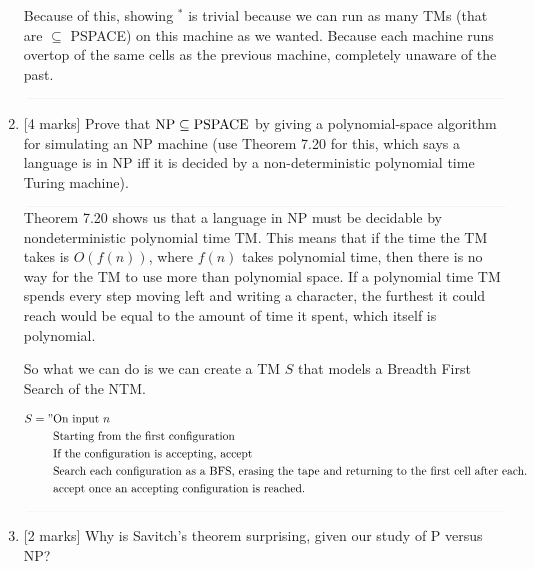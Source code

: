 \documentclass{article}
\begin{document}
\begin{enumerate}
            Because of this, showing $^*$ is trivial because we can run as many TMs (that are $\subseteq$ PSPACE) on this machine as we wanted. Because each machine runs overtop of the same cells as the previous machine, completely unaware of the past.

            $\textcolor[RGB]{220,220,220}{\rule{\linewidth}{0.2pt}}$

    \item {[4 marks]} Prove that ${\rm NP}\subseteq {\rm PSPACE}$ by giving a polynomial-space algorithm for simulating an NP machine (use Theorem 7.20 for this, which says a language is in NP iff it is decided by a non-deterministic polynomial time Turing machine).

            $\textcolor[RGB]{220,220,220}{\rule{\linewidth}{0.2pt}}$
            Theorem 7.20 shows us that a language in NP must be decidable by nondeterministic polynomial time TM. This means that if the time the TM takes is $O(f(n))$, where $f(n)$ takes polynomial time, then there is no way for the TM to use more than polynomial space. If a polynomial time TM spends every step moving left and writing a character, the furthest it could reach would be equal to the amount of time it spent, which itself is polynomial.

            So what we can do is we can create a TM $S$ that models a Breadth First Search of the NTM.

            \begin{equation}
            	\begin{split}
            		S = "& \text{On input $n$} \\
            			 & \text{Starting from the first configuration} \\
            			 & \text{If the configuration is accepting, accept} \\
                         & \text{Search each configuration as a BFS, erasing the tape and returning to the first cell after each.} \\
            			 & \text{accept once an accepting configuration is reached.}
            	\end{split}
            \end{equation}

            $\textcolor[RGB]{220,220,220}{\rule{\linewidth}{0.2pt}}$

            \item {[2 marks]} Why is Savitch's theorem surprising, given our study of P versus NP?


\end{enumerate}
\end{document}
